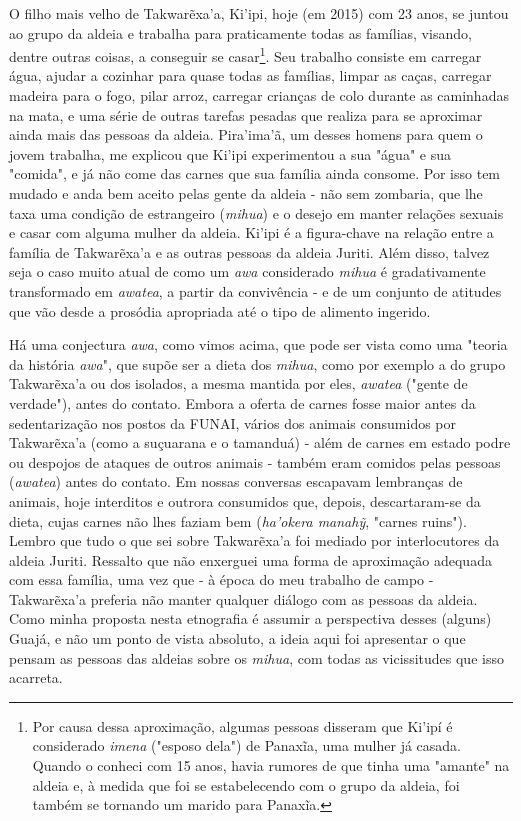 O filho mais velho de Takwarẽxa'a, Ki'ipi, hoje (em 2015) com 23 anos,
se juntou ao grupo da aldeia e trabalha para praticamente todas as
famílias, visando, dentre outras coisas, a conseguir se casar\footnote{Por
  causa dessa aproximação, algumas pessoas disseram que Ki'ipí é
  considerado \emph{imena} ("esposo dela") de Panaxĩa, uma mulher já
  casada. Quando o conheci com 15 anos, havia rumores de que tinha uma
  "amante" na aldeia e, à medida que foi se estabelecendo com o grupo da
  aldeia, foi também se tornando um marido para Panaxĩa.}. Seu trabalho
consiste em carregar água, ajudar a cozinhar para quase todas as
famílias, limpar as caças, carregar madeira para o fogo, pilar arroz,
carregar crianças de colo durante as caminhadas na mata, e uma série de
outras tarefas pesadas que realiza para se aproximar ainda mais das
pessoas da aldeia. Pira'ima'ã, um desses homens para quem o jovem
trabalha, me explicou que Ki'ipi experimentou a sua "água" e sua
"comida", e já não come das carnes que sua família ainda consome. Por
isso tem mudado e anda bem aceito pelas gente da aldeia - não sem
zombaria, que lhe taxa uma condição de estrangeiro (\emph{mihua}) e o
desejo em manter relações sexuais e casar com alguma mulher da aldeia.
Ki'ipi é a figura-chave na relação entre a família de Takwarẽxa'a e as
outras pessoas da aldeia Juriti. Além disso, talvez seja o caso muito
atual de como um \emph{awa} considerado \emph{mihua} é gradativamente
transformado em \emph{awatea}, a partir da convivência - e de um
conjunto de atitudes que vão desde a prosódia apropriada até o tipo de
alimento ingerido.

Há uma conjectura \emph{awa}, como vimos acima, que pode ser vista como
uma "teoria da história \emph{awa}", que supõe ser a dieta dos
\emph{mihua}, como por exemplo a do grupo Takwarẽxa'a ou dos isolados, a
mesma mantida por eles, \emph{awatea} ("gente de verdade"), antes do
contato. Embora a oferta de carnes fosse maior antes da sedentarização
nos postos da FUNAI, vários dos animais consumidos por Takwarẽxa'a (como
a suçuarana e o tamanduá) - além de carnes em estado podre ou despojos
de ataques de outros animais - também eram comidos pelas pessoas
(\emph{awatea}) antes do contato. Em nossas conversas escapavam
lembranças de animais, hoje interditos e outrora consumidos que, depois,
descartaram-se da dieta, cujas carnes não lhes faziam bem
(\emph{ha'okera manahỹ}, "carnes ruins"). Lembro que tudo o que sei
sobre Takwarẽxa'a foi mediado por interlocutores da aldeia Juriti.
Ressalto que não enxerguei uma forma de aproximação adequada com essa
família, uma vez que - à época do meu trabalho de campo - Takwarẽxa'a
preferia não manter qualquer diálogo com as pessoas da aldeia. Como
minha proposta nesta etnografia é assumir a perspectiva desses (alguns)
Guajá, e não um ponto de vista absoluto, a ideia aqui foi apresentar o
que pensam as pessoas das aldeias sobre os \emph{mihua}, com todas as
vicissitudes que isso acarreta.


